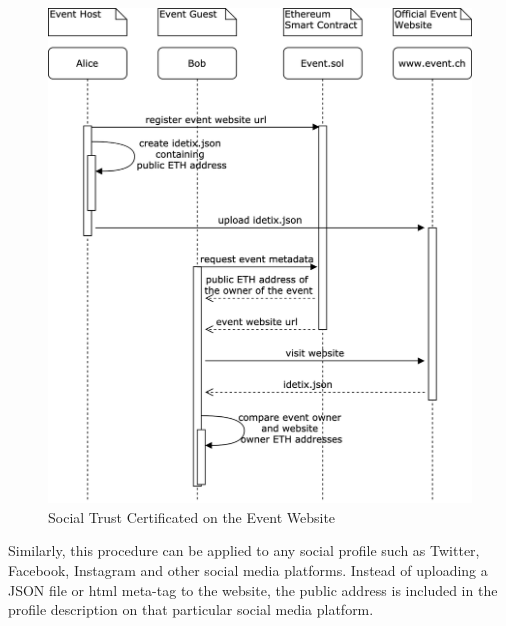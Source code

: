 \begin{figure}[H]
    \centering
    \includegraphics[width=14cm]{figures/social-trust-certificates.png}
    \caption{Social Trust Certificated on the Event Website}
    \label{fig:trust-certificate-event-website}
\end{figure}

Similarly, this procedure can be applied to any social profile such as Twitter, Facebook, Instagram and other social media platforms. Instead of uploading a JSON file or html meta-tag to the website, the public address is included in the profile description on that particular social media platform. 